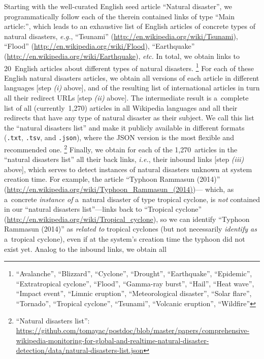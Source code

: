 \documentclass[letterpaper]{article}
\begin{document}
Starting with the well-curated English seed article ``Natural disaster'',
we programmatically follow each of the therein contained links of type ``Main article:'',
which leads to an exhaustive list of English articles
of concrete types of natural disasters,
\emph{e.g.}, ``Tsunami'' (\url{http://en.wikipedia.org/wiki/Tsunami}),
``Flood'' (\url{http://en.wikipedia.org/wiki/Flood}),
``Earthquake'' (\url{http://en.wikipedia.org/wiki/Earthquake}),
\emph{etc.} In total, we obtain links to 20~English articles
about different types of natural disasters.%
\footnote{``Avalanche'', ``Blizzard'', ``Cyclone'', ``Drought'', ``Earthquake'',
``Epidemic'', ``Extratropical cyclone'', ``Flood'', ``Gamma-ray burst'', ``Hail'',
``Heat wave'', ``Impact event'', ``Limnic eruption'', ``Meteorological disaster'',
``Solar flare'', ``Tornado'', ``Tropical cyclone'', ``Tsunami'',
``Volcanic eruption'', ``Wildfire''}
For each of these English natural disasters articles,
we obtain all versions of each article in different languages
[step \emph{(i)} above],
and of the resulting list of international articles
in turn all their redirect URLs [step \emph{(ii)} above].
The intermediate result is a~complete list of all (currently~1,270) articles
in all Wikipedia languages and all their redirects
that have any type of natural disaster as their subject.
We call this list the ``natural disasters list''
and make it publicly available in different formats
(\texttt{.txt}, \texttt{.tsv}, and \texttt{.json}), where the JSON version
is the most flexible and recommended one.%
\footnote{``Natural disasters list'':
\url{https://github.com/tomayac/postdoc/blob/master/papers/comprehensive-wikipedia-monitoring-for-global-and-realtime-natural-disaster-detection/data/natural-disasters-list.json}}
Finally, we obtain for each of the 1,270~articles
in the ``natural disasters list''
all their back links, \emph{i.e.}, their inbound links
[step \emph{(iii)} above], which serves to detect
instances of natural disasters unknown at system creation time.
For example, the article ``Typhoon Rammasun (2014)''
(\url{http://en.wikipedia.org/wiki/Typhoon_Rammasun_(2014)})---%
which, as a~concrete \emph{instance of} a~natural disaster
of type tropical cyclone, is \emph{not} contained in our
``natural disasters list''---links back to ``Tropical cyclone''
(\url{http://en.wikipedia.org/wiki/Tropical_cyclone}),
so we can identify ``Typhoon Rammasun (2014)'' as \emph{related to}
tropical cyclones (but not necessarily \emph{identify as} a~tropical cyclone),
even if at the system's creation time the typhoon did not exist yet.
Analog to the inbound links, we obtain all
\end{document}
